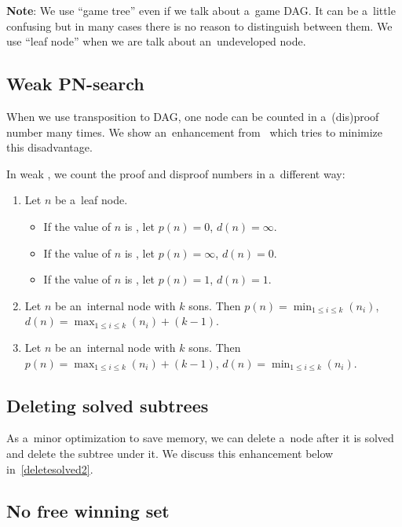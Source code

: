\textbf{Note}: We use ``game tree'' even if we talk about a~game DAG. It can be a~little confusing 
but in many cases there is no reason to distinguish between them. 
We use ``leaf node'' when we are talk about an~undeveloped node. 

\subsection{Weak PN-search} \label{weak}

When we use transposition to DAG, one node can be counted in a~(dis)proof number many times.
We show an~enhancement from~\cite{cweak} which tries to minimize this disadvantage. 

In weak , we count the proof and disproof numbers in a~different way:
\begin{enumerate} 
	\item Let $n$ be a~leaf node. 
		\begin{itemize}
			\item If the value of $n$ is , let $p(n)=0$, $d(n)=\infty$.
			\item If the value of $n$ is , let $p(n)=\infty$, $d(n)=0$.
			\item If the value of $n$ is , let $p(n)=1$, $d(n)=1$.
		\end{itemize}
	\item Let $n$ be an~internal  node with $k$ sons. Then \newline
		$p(n) = \min_{1 \le i \le k}(n_i)$, \newline
		$d(n) = \max_{1 \le i \le k}(n_i) + (k-1)$. 
	\item Let $n$ be an~internal  node with $k$ sons. Then \newline
		$p(n) = \max_{1 \le i \le k}(n_i) + (k-1)$, \newline 
		$d(n) = \min_{1 \le i \le k}(n_i)$.
\end{enumerate}
		
\subsection{Deleting solved subtrees} \label{deletesolved}

As a~minor optimization to save memory, we can delete a~node after it is solved
and delete the subtree under it. We discuss this enhancement below in~\ref{deletesolved2}.

\subsection{No free winning set} \label{nofreeK4}

